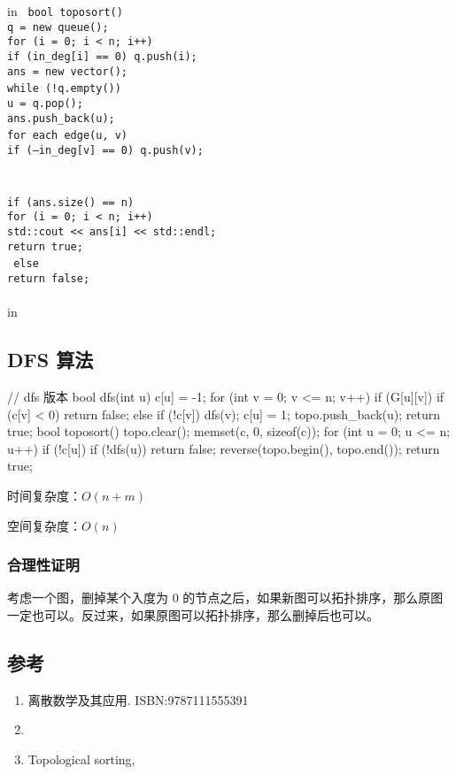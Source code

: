 in
\texttt{
bool toposort() {\\	q = new queue();\\	for (i = 0; i < n; i++)\\		if (in_deg[i] == 0) q.push(i);\\	ans = new vector();\\	while (!q.empty()) {\\		u = q.pop();\\		ans.push_back(u);\\		for each edge(u, v) {\\			if (--in_deg[v] == 0) q.push(v);\\		}\\	}\\	if (ans.size() == n) {\\		for (i = 0; i < n; i++)\\			std::cout << ans[i] << std::endl;\\		return true;\\	} else {\\		return false;\\	}\\}}
 in

\subsection{DFS 算法}

\begin{cppcode}
// dfs 版本
bool dfs(int u) {
  c[u] = -1;
  for (int v = 0; v <= n; v++)
    if (G[u][v]) {
      if (c[v] < 0)
        return false;
      else if (!c[v])
        dfs(v);
    }
  c[u] = 1;
  topo.push_back(u);
  return true;
}
bool toposort() {
  topo.clear();
  memset(c, 0, sizeof(c));
  for (int u = 0; u <= n; u++)
    if (!c[u])
      if (!dfs(u)) return false;
  reverse(topo.begin(), topo.end());
  return true;
}
\end{cppcode}

时间复杂度：$O(n+m)$

空间复杂度：$O(n)$

\subsubsection{合理性证明}

考虑一个图，删掉某个入度为 0 的节点之后，如果新图可以拓扑排序，那么原图一定也可以。反过来，如果原图可以拓扑排序，那么删掉后也可以。

\subsection{参考}

\begin{enumerate}
\item 离散数学及其应用. ISBN:9787111555391
\item \href{https://blog.csdn.net/dm_vincent/article/details/7714519}{}
\item Topological sorting, \href{https://en.wikipedia.org/w/index.php?title=Topological_sorting&oldid=854351542}{}
\end{enumerate}
